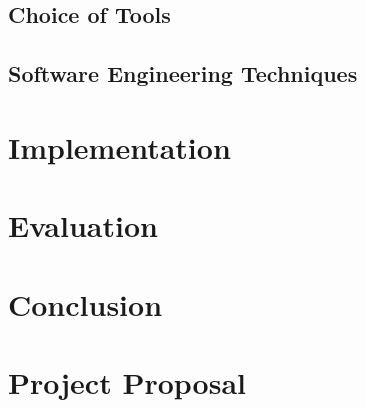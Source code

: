 \documentclass[12pt,a4paper,twoside,openright]{report}
\begin{document}

\section{Choice of Tools}


\section{Software Engineering Techniques}



\chapter{Implementation}


\chapter{Evaluation}











\chapter{Conclusion}




\appendix

\chapter{Project Proposal}


\end{document}
